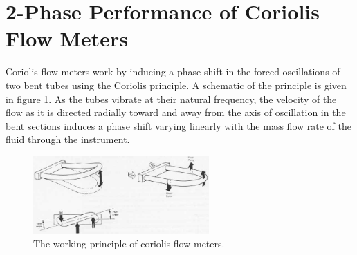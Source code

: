 \documentclass{report}
\begin{document}
\section{2-Phase Performance of Coriolis Flow Meters}
Coriolis flow meters work by inducing a phase shift in the forced oscillations of two bent tubes using the Coriolis principle. A schematic of the principle is given in figure \ref{fig:coriolis}. As the tubes vibrate at their natural frequency, the velocity of the flow as it is directed radially toward and away from the axis of oscillation in the bent sections induces a phase shift varying linearly with the mass flow rate of the fluid through the instrument. \cite{ISO}\cite{O'Banion 2013}  \\
\begin{figure}
\includegraphics[width=0.6\textwidth]{coriolis}
\caption{The working principle of coriolis flow meters.}%
\label{fig:coriolis}
\end{figure}
\end{document}
